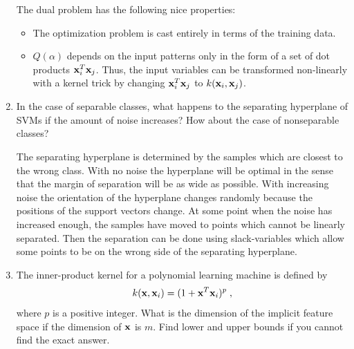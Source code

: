 \begin{enumerate}
\begin{solution}
    The dual problem has the following nice properties:
    \begin{itemize}
    \item The optimization problem is cast entirely in terms of the
      training data.
    \item $Q(\alpha)$ depends on the input patterns only in the form
      of a set of dot products $\mathbf{x}_i^T\mathbf{x}_j$.  Thus, the input
      variables can be transformed non-linearly with a kernel trick by
      changing $\mathbf{x}_i^T\mathbf{x}_j$ to $k(\mathbf{x}_i,\mathbf{x}_j)$.
    \end{itemize}
    


  \end{solution}
  
\item In the case of separable classes, what happens to the separating
  hyperplane of SVMs if the amount of noise increases? How about the
  case of nonseparable classes?

  \begin{solution}

    The separating hyperplane is determined by the samples which are
    closest to the wrong class.  With no noise the hyperplane will be
    optimal in the sense that the margin of separation will be as wide
    as possible.  With increasing noise the orientation of the
    hyperplane changes randomly because the positions of the support
    vectors change.  At some point when the noise has increased enough,
    the samples have moved to points which cannot be linearly separated.
    Then the separation can be done using slack-variables which allow
    some points to be on the wrong side of the separating hyperplane.

    
  \end{solution}
  
\item The inner-product kernel for a polynomial learning machine is
  defined by
  \begin{displaymath}
    k(\mathbf{x},\mathbf{x}_i) = (1 + \mathbf{x}^T \mathbf{x}_i)^p \; ,
  \end{displaymath}
  where $p$ is a positive integer.  What is the dimension of the
  implicit feature space if the dimension of $\mathbf{x}$ is $m$.  Find lower
  and upper bounds if you cannot find the exact answer.


\end{enumerate}
